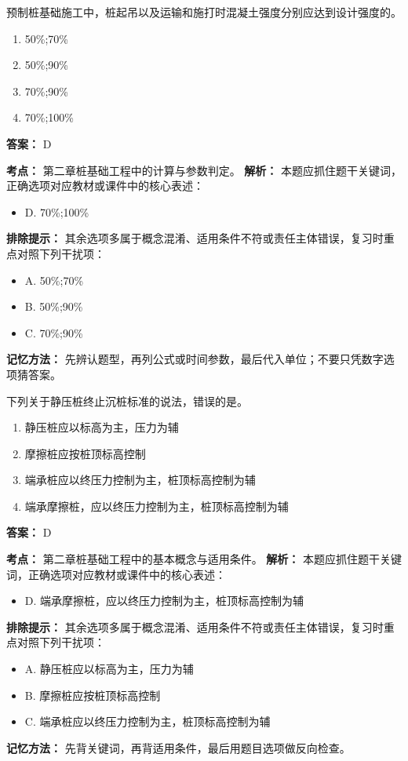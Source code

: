 \documentclass[UTF8,fontset=fandol,11pt]{ctexart}
\begin{document}
\begin{quizbox}[title={第 1 题}]
预制桩基础施工中，桩起吊以及运输和施打时混凝土强度分别应达到设计强度的。\\
\begin{enumerate}[label=\Alph*.]
\item 50\%;70\%
\item 50\%;90\%
\item 70\%;90\%
\item 70\%;100\%
\end{enumerate}
\textbf{答案：} D
\vspace{0.25em}
\begin{answerbox}[title={考点解析}]
\textbf{考点：} 第二章桩基础工程中的计算与参数判定。
\textbf{解析：} 本题应抓住题干关键词，正确选项对应教材或课件中的核心表述：
\begin{itemize}
\item D. 70\%;100\%
\end{itemize}
\textbf{排除提示：} 其余选项多属于概念混淆、适用条件不符或责任主体错误，复习时重点对照下列干扰项：
\begin{itemize}
\item A. 50\%;70\%
\item B. 50\%;90\%
\item C. 70\%;90\%
\end{itemize}
\textbf{记忆方法：} 先辨认题型，再列公式或时间参数，最后代入单位；不要只凭数字选项猜答案。
\end{answerbox}
\end{quizbox}

\begin{quizbox}[title={第 2 题}]
下列关于静压桩终止沉桩标准的说法，错误的是。\\
\begin{enumerate}[label=\Alph*.]
\item 静压桩应以标高为主，压力为辅
\item 摩擦桩应按桩顶标高控制
\item 端承桩应以终压力控制为主，桩顶标高控制为辅
\item 端承摩擦桩，应以终压力控制为主，桩顶标高控制为辅
\end{enumerate}
\textbf{答案：} D
\vspace{0.25em}
\begin{answerbox}[title={考点解析}]
\textbf{考点：} 第二章桩基础工程中的基本概念与适用条件。
\textbf{解析：} 本题应抓住题干关键词，正确选项对应教材或课件中的核心表述：
\begin{itemize}
\item D. 端承摩擦桩，应以终压力控制为主，桩顶标高控制为辅
\end{itemize}
\textbf{排除提示：} 其余选项多属于概念混淆、适用条件不符或责任主体错误，复习时重点对照下列干扰项：
\begin{itemize}
\item A. 静压桩应以标高为主，压力为辅
\item B. 摩擦桩应按桩顶标高控制
\item C. 端承桩应以终压力控制为主，桩顶标高控制为辅
\end{itemize}
\textbf{记忆方法：} 先背关键词，再背适用条件，最后用题目选项做反向检查。
\end{answerbox}
\end{quizbox}
\end{document}
